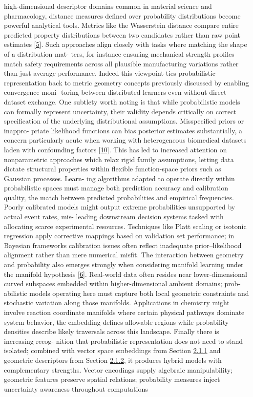 \documentclass[
]{article}
\begin{document}
high-dimensional descriptor domains common in material science and
pharmacology, distance measures defined over probability distributions
become powerful analytical tools. Metrics like the Wasserstein distance
compare entire predicted property distributions between two candidates
rather than raw point estimates {[}\hyperref[_bookmark45]{5}{]}. Such
approaches align closely with tasks where matching the shape of a
distribution mat- ters, for instance ensuring mechanical strength
profiles match safety requirements across all plausible manufacturing
variations rather than just average performance. Indeed this viewpoint
ties probabilistic representation back to metric geometry concepts
previously discussed by enabling convergence moni- toring between
distributed learners even without direct dataset exchange. One subtlety
worth noting is that while probabilistic models can formally represent
uncertainty, their validity depends critically on correct specification
of the underlying distributional assumptions. Misspecified priors or
inappro- priate likelihood functions can bias posterior estimates
substantially, a concern particularly acute when working with
heterogeneous biomedical datasets laden with confounding factors
{[}\hyperref[_bookmark50]{10}{]}. This has led to increased attention on
nonparametric approaches which relax rigid family assumptions, letting
data dictate structural properties within flexible function-space priors
such as Gaussian processes. Learn- ing algorithms adapted to operate
directly within probabilistic spaces must manage both prediction
accuracy and calibration quality, the match between predicted
probabilities and empirical frequencies. Poorly calibrated models might
output extreme probabilities unsupported by actual event rates, mis-
leading downstream decision systems tasked with allocating scarce
experimental resources. Techniques like Platt scaling or isotonic
regression apply corrective mappings based on validation set
performance; in Bayesian frameworks calibration issues often reflect
inadequate prior--likelihood alignment rather than mere numerical
misfit. The interaction between geometry and probability also emerges
strongly when considering manifold learning under the manifold
hypothesis {[}\hyperref[_bookmark46]{6}{]}. Real-world data often
resides near lower-dimensional curved subspaces embedded within
higher-dimensional ambient domains; prob- abilistic models operating
here must capture both local geometric constraints and stochastic
variation along those manifolds. Applications in chemistry might involve
reaction coordinate manifolds where certain physical pathways dominate
system behavior, the embedding defines allowable regions while
probability densities describe likely traversals across this landscape.
Finally there is increasing recog- nition that probabilistic
representation does not need to stand isolated; combined with vector
space embeddings from Section
\hyperref[vector-spaces-and-linear-algebra]{2.1.1} and geometric
descriptors from Section \hyperref[geometric-and-spatial-models]{2.1.2},
it produces hybrid models with complementary strengths. Vector encodings
supply algebraic manipulability; geometric features preserve spatial
relations; probability measures inject uncertainty awareness throughout
computations
\end{document}
